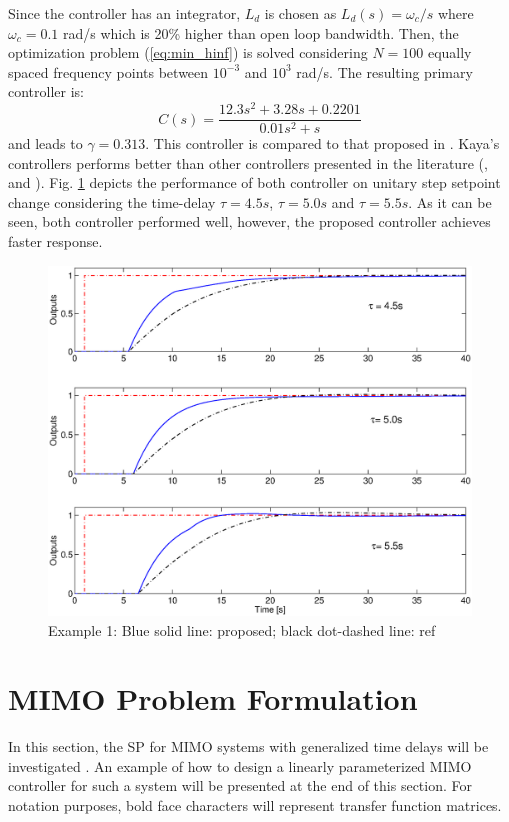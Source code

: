 \documentclass[default]{svmult}
\begin{document}
Since the controller has an integrator, $L_d$ is chosen as $L_d(s)=\omega_c/s$ where $\omega_c=0.1$ rad/s which is 20\% higher than open loop bandwidth. Then, the optimization problem (\ref{eq:min_hinf}) is solved considering $N=100$ equally spaced frequency points between $10^{-3}$ and $10^3$ rad/s. The resulting primary controller is:
\begin{equation}
C(s)=\frac{12.3 s^2 + 3.28 s + 0.2201}{0.01 s^2 + s}
\end{equation}
and leads to $\gamma=0.313$.
This controller is compared to that proposed in \cite{Kay01}. Kaya's controllers performs better than other controllers presented in the literature (\cite{PB94}, \cite{Hag92} and \cite{HWC95}).
Fig. \ref{fig:example1} depicts 
the performance of both controller on unitary step setpoint change considering the time-delay $\tau=4.5s$, $\tau=5.0s$ and $\tau=5.5s$. As it can be seen, both controller performed well, however, the proposed controller achieves faster response. %
\begin{figure}[H]
\centering
\includegraphics[scale=0.31]{fig/example1_final_paper}
\caption{Example 1: Blue solid line: proposed;  black dot-dashed line: ref \cite{Kay01} }
\label{fig:example1}
\end{figure}%
\section{MIMO Problem Formulation}
\label{sec:3}
In this section, the SP for MIMO systems with generalized time delays will be investigated . An example of how to design a linearly parameterized MIMO controller for such a system will be presented at the end of this section. For notation purposes, bold face characters will represent transfer function matrices.
\end{document}
